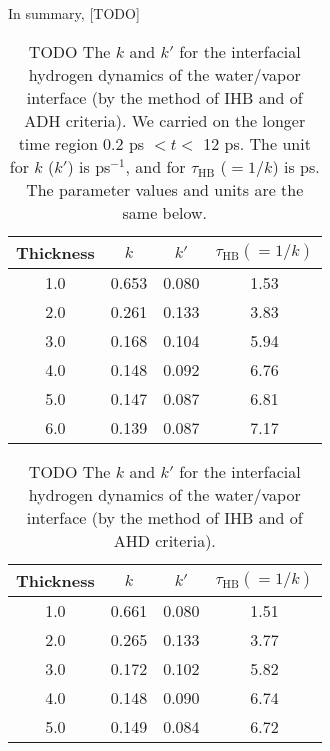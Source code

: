In summary, [TODO] 
\begin{table}[htb]
\centering
\caption{\label{tab:k_k_prime_tau_128w_pure_ihb_ADH} 
    TODO The $k$ and $k'$ for the interfacial hydrogen dynamics of the water/vapor interface (by the method of IHB and of ADH criteria). 
We carried on the longer time region 0.2 ps $< t <$ 12 ps. The unit for $k$ ($k'$) is ps$^{-1}$, and for $\tau_{\text{HB}}$ ($=1/k$) 
is ps. The parameter values and units are the same below.} 
\begin{tabular}{cccc}
 Thickness & $k$ & $k'$ & $\tau_{\text{HB}} (=1/k)$ \\
\hline
  1.0 & 0.653 & 0.080 & 1.53  \\
  2.0 & 0.261 & 0.133 & 3.83  \\
  3.0 & 0.168 & 0.104 & 5.94  \\
  4.0 & 0.148 & 0.092 & 6.76  \\
  5.0 & 0.147 & 0.087 & 6.81  \\
  6.0 & 0.139 & 0.087 & 7.17  \\
\end{tabular}
\end{table}
\begin{table}[htb]
\centering
\caption{\label{tab:k_k_prime_tau_128w_pure_ihb_AHD} 
    TODO The $k$ and $k'$ for the interfacial hydrogen dynamics of the water/vapor interface (by the method of IHB and of AHD criteria).} 
\begin{tabular}{cccc}
 Thickness & $k$ & $k'$ & $\tau_{\text{HB}} (=1/k)$ \\
\hline
  1.0 & 0.661 & 0.080 & 1.51  \\
  2.0 & 0.265 & 0.133 & 3.77  \\
  3.0 & 0.172 & 0.102 & 5.82  \\
  4.0 & 0.148 & 0.090 & 6.74  \\
  5.0 & 0.149 & 0.084 & 6.72  \\
\end{tabular}
\end{table}

